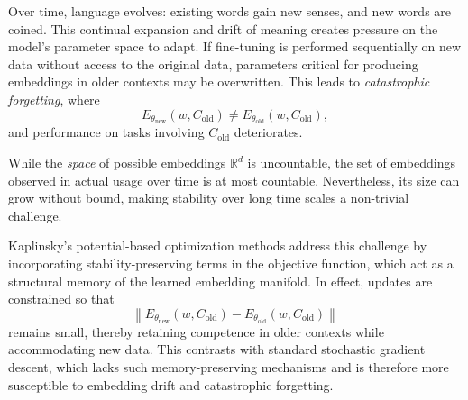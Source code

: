 \documentclass[12pt]{article}
\begin{document}
Over time, language evolves: existing words gain new senses, and new words are coined. 
This continual expansion and drift of meaning creates pressure on the model's parameter space 
to adapt. If fine-tuning is performed sequentially on new data without access to the original data, 
parameters critical for producing embeddings in older contexts may be overwritten. 
This leads to \emph{catastrophic forgetting}, where
\[
E_{\theta_{\mathrm{new}}}(w, C_{\mathrm{old}}) \neq 
E_{\theta_{\mathrm{old}}}(w, C_{\mathrm{old}}),
\]
and performance on tasks involving $C_{\mathrm{old}}$ deteriorates.

While the \emph{space} of possible embeddings $\mathbb{R}^d$ is uncountable, 
the set of embeddings observed in actual usage over time is at most countable. 
Nevertheless, its size can grow without bound, making stability over long time scales 
a non-trivial challenge.

Kaplinsky's potential-based optimization methods address this challenge by incorporating 
stability-preserving terms in the objective function, which act as a structural memory 
of the learned embedding manifold. In effect, updates are constrained so that
\[
\left\| E_{\theta_{\mathrm{new}}}(w, C_{\mathrm{old}}) - E_{\theta_{\mathrm{old}}}(w, C_{\mathrm{old}}) \right\|
\]
remains small, thereby retaining competence in older contexts while accommodating new data. 
This contrasts with standard stochastic gradient descent, which lacks such 
memory-preserving mechanisms and is therefore more susceptible to embedding drift 
and catastrophic forgetting.
\end{document}
